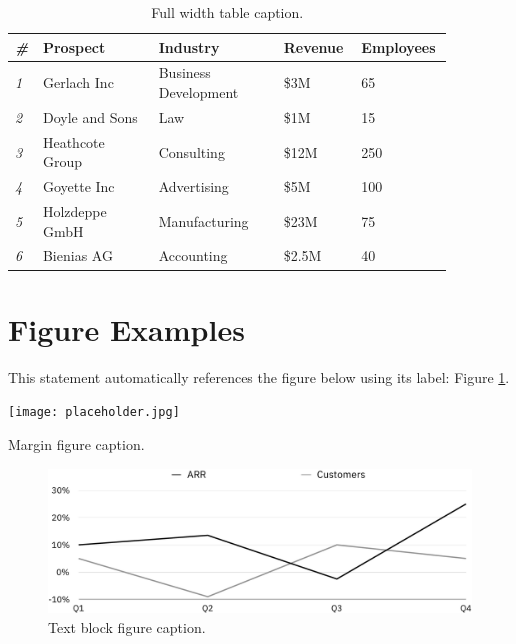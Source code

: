 \documentclass[
	a4paper, %
	11pt, %
]{DC_Report}
\begin{document}
\begin{table} %
	\caption{Full width table caption.}
	\begin{tabular}{C{0.03\linewidth} L{0.25\linewidth} L{0.27\linewidth} L{0.16\linewidth} L{0.16\linewidth}}
		\toprule
		\textit{\#} & \textbf{Prospect} & \textbf{Industry} & \textbf{Revenue} & \textbf{Employees} \\
		\midrule
		\textit{1} & Gerlach Inc & Business Development & \$3M & 65\\
		\textit{2} & Doyle and Sons & Law & \$1M & 15\\
		\textit{3} & Heathcote Group & Consulting & \$12M & 250\\
		\textit{4} & Goyette Inc & Advertising & \$5M & 100\\
		\textit{5} & Holzdeppe GmbH & Manufacturing & \$23M & 75\\
		\textit{6} & Bienias AG & Accounting & \$2.5M & 40\\
		\bottomrule
	\end{tabular}
\end{table}


\section{Figure Examples}

This statement automatically references the figure below using its label: Figure \ref{fig:example}.


\begin{marginfigure} %
	\texttt{[image: placeholder.jpg]}
	\caption{Margin figure caption.}
\end{marginfigure}


\begin{figure}[H] %
	\includegraphics[width=\linewidth]{Images/ARR.pdf}
	\caption{Text block figure caption.}
	\label{fig:example} %
\end{figure}
\end{document}
